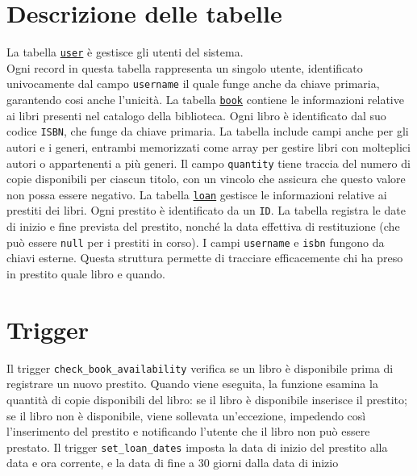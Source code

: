 \documentclass[]{report}
\begin{document}
\section{Descrizione delle tabelle}
La tabella \texttt{\underline{user}} è gestisce gli utenti del sistema.\\
Ogni record in questa tabella rappresenta un singolo utente, identificato univocamente dal campo \texttt{username} il quale funge anche da chiave primaria, garantendo cosi anche l'unicità.\bskip
La tabella \texttt{\underline{book}} contiene le informazioni relative ai libri presenti nel catalogo della biblioteca. Ogni libro è identificato dal suo codice \texttt{ISBN}, che funge da chiave primaria. La tabella include campi anche per gli autori e i generi, entrambi memorizzati come array per gestire libri con molteplici autori o appartenenti a più generi. Il campo \texttt{quantity} tiene traccia del numero di copie disponibili per ciascun titolo, con un vincolo che assicura che questo valore non possa essere negativo.\bskip
La tabella \texttt{\underline{loan}} gestisce le informazioni relative ai prestiti dei libri. Ogni prestito è identificato da un \texttt{ID}.\sskip
La tabella registra le date di inizio e fine prevista del prestito, nonché la data effettiva di restituzione (che può essere \texttt{null} per i prestiti in corso).\sskip
I campi \texttt{username} e \texttt{isbn} fungono da chiavi esterne. Questa struttura permette di tracciare efficacemente chi ha preso in prestito quale libro e quando.

\section{Trigger}
Il trigger \texttt{check\_book\_availability} verifica se un libro è disponibile prima di registrare un nuovo prestito.
Quando viene eseguita, la funzione esamina la quantità di copie disponibili del libro:
se il libro è disponibile inserisce il prestito; se il libro non è disponibile, viene sollevata un'eccezione, impedendo così l'inserimento del prestito e notificando l'utente che il libro non può essere prestato.\bskip
Il trigger \texttt{set\_loan\_dates} imposta la data di inizio del prestito alla data e ora corrente, e la data di fine a 30 giorni dalla data di inizio
\end{document}
